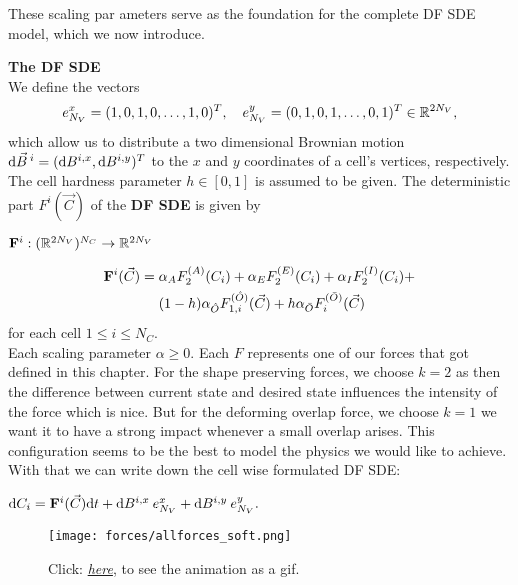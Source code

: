 These scaling par
ameters serve as the foundation for the complete DF SDE model, which we now introduce.
\begin{definition} \textbf{The DF SDE} \\
	We define the vectors
	\[
	e_{N_V}^{x} = (1,0,1,0,\ldots,1,0)^T, \quad e_{N_V}^{y} = (0,1,0,1,\ldots,0,1)^T \in \mathbb{R}^{2N_V},
	\]
	which allow us to distribute a two dimensional Brownian motion \(\mathrm{d} \vec{B}^{\:i} = (\mathrm{d} B^{i,x}, \mathrm{d} B^{i,y})^T\) to the $x$ and $y$ coordinates of a cell's vertices, respectively.
	The cell hardness parameter $h \in [0,1]$ is assumed to be given.
	The deterministic part $F^{i}(\vec{C})$ of the \textbf{DF SDE} is given by 
	\begin{center}
		$ \mathbf{F}^i: (\mathbb{R}^{2N_V})^{N_C} \rightarrow \mathbb{R}^{2N_V} $
	\end{center}
	\begin{align}
		\begin{split}
			\mathbf{F}^{i}(\vec{C}) = \; & \alpha_{A} F_2^{(A)}(C_i) + \alpha_{E} F_2^{(E)}(C_i) + \alpha_{I} F_2^{(I)}(C_i) + \\
			& (1-h)\alpha_{\hat{O}} F_{1,i}^{(\hat{O})}(\vec{C}) + h \alpha_{\bar{O}} F_i^{(\bar{O})}(\vec{C})
		\end{split}
	\end{align}
	for each cell $1 \leq i \leq N_C$. \\ 
	Each scaling parameter $\alpha \geq 0$. 
	Each $F$ represents one of our forces that got defined in this chapter. 
	For the shape preserving forces, we choose $k=2$ as then the difference between current state and desired state influences the intensity of the force which is nice.
	But for the deforming overlap force, we choose $k=1$ we want it to have a strong impact whenever a small overlap arises. 
	This configuration seems to be the best to model the physics we would like to achieve. 
	With that we can write down the cell wise formulated DF SDE:
	\begin{center}
		$\mathrm{d} C_i = \mathbf{F}^{i}(\vec{C}) \mathrm{d} t + \mathrm{d} B^{i,x} \: e_{N_V}^{x} + \mathrm{d} B^{i,y} \: e_{N_V}^{y}.$
	\end{center} 


\end{definition}

\begin{figure}[h!]
	\begin{center}
		\texttt{[image: forces/allforces\_soft.png]}
			\caption{Click: \href{https://github.com/tivo476c/FlexibleCellModel/blob/master/figures/gifs/showForces/show-allForces-soft.gif}{\textit{here}}, to see the animation as a gif.
			}
			\label{fig:overlapForce}
	\end{center}
\end{figure}

